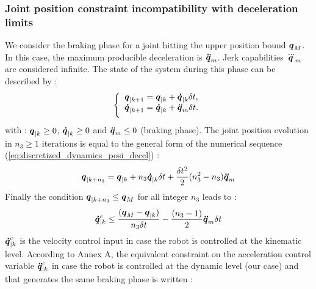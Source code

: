 \documentclass[a4paper, 10pt, conference]{ieeeconf}      %
\newcommand{\vect}[1]{\mbox{\boldmath${#1}$}}%
\begin{document}
{{\subsubsection{Joint position constraint incompatibility with deceleration limits}
We consider the braking phase for a joint hitting the upper position bound $\vect{q}_{M}$. In this case, the maximum producible deceleration is $\vect{\ddot{q}}_{m}$. Jerk capabilities $\vect{\dddot{q}}_{m}$ are considered infinite. The state of the system during this phase can be described by :
\begin{equation} 
\left\{\begin{array}{lcl}
\vect{q}_{|k+1} = \vect{q}_{|k} + \vect{\dot{q}}_{|k} \delta t, \\
\vspace{2mm}
\vect{\dot{q}}_{|k+1} = \vect{\dot{q}}_{|k} + \vect{\ddot{q}}_{m} \delta t.
\end{array}\right.
\label{eq:discretized_dynamics_posi_decel}
\end{equation}
with : $\vect{q}_{|k} \geq 0$, $\vect{\dot{q}}_{|k} \geq 0$ and  $\vect{\ddot{q}}_{m} \leq 0$ (braking phase). The joint position evolution in $n_3  \geq 1$ iterations is equal to the general form of the numerical sequence (\ref{eq:discretized_dynamics_posi_decel}) :
\begin{equation}
\begin{split}
\vect{q}_{|k+n_3} = \vect{q}_{|k} + n_3 \vect{\dot{q}}_{|k} \delta t + \frac{\delta t^2}{2} (n_3^2-n_3) \vect{\ddot{q}}_{m} 
\label{eq:q_evolution_with_const_qddot_m}
\end{split}
\end{equation}
Finally the condition $\vect{q}_{|k+n_3} \leq \vect{q}_{M}$ for all integer $n_3$ leads to :
\begin{equation}
\begin{split}
\vect{\dot{q}}_{|k}^{c} \leq \frac{(\vect{q}_M-\vect{q}_{|k})}{n_3 \delta t} - \frac{(n_3-1)}{2} \vect{\ddot{q}}_m \delta t
\label{eq:q_dot_posi_acc_comp}
\end{split}
\end{equation}
$\vect{\dot{q}}_{|k}^{c}$ is the velocity control input in case the robot is controlled at the kinematic level. According to Annex A, the equivalent constraint on the acceleration control variable $\vect{\ddot{q}}_{|k}^{c}$ in case the robot is controlled at the dynamic level (our case) and that generates the same braking phase is written :
\begin{equation}
\begin{split}

\end{split}
\end{equation}}}
\end{document}
